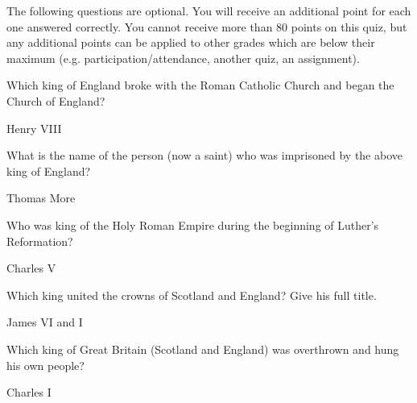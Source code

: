 \documentclass[12pt]{examdesign}
\begin{document}
\pagebreak
\begin{shortanswer}[title={Bonus Section}, rearrange=no]
	The following questions are optional. You will receive an additional point for each one answered correctly. You cannot receive more than 80 points on this quiz, but any additional points can be applied to other grades which are below their maximum (e.g. participation/attendance, another quiz, an assignment).

	\begin{question}
		Which king of England broke with the Roman Catholic Church and began the Church of England?
		\examvspace{0.75 in}
		\begin{answer}
			Henry VIII
		\end{answer}
	\end{question}

	\begin{question}
		What is the name of the person (now a saint) who was imprisoned by the above king of England?
		\examvspace{0.75 in}
		\begin{answer}
			Thomas More
		\end{answer}
	\end{question}

	\begin{question}
		Who was king of the Holy Roman Empire during the beginning of Luther's Reformation?
		\examvspace{0.75 in}
		\begin{answer}
			Charles V
		\end{answer}
	\end{question}

	\begin{question}
		Which king united the crowns of Scotland and England? Give his full title.
		\examvspace{0.75 in}
		\begin{answer}
			James VI and I
		\end{answer}
	\end{question}

	\begin{question}
		Which king of Great Britain (Scotland and England) was overthrown and hung his own people?
		\examvspace{0.75 in}
		\begin{answer}
			Charles I
		\end{answer}
	\end{question}
\end{shortanswer}
\end{document}
